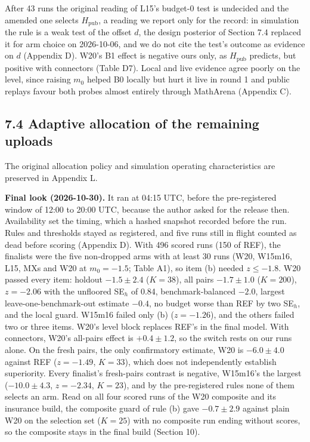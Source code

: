 \documentclass[
]{article}
\begin{document}
After 43 runs the original reading of L15's budget-0 test is undecided
and the amended one selects \(H_{\mathrm{pub}}\), a reading we report
only for the record: in simulation the rule is a weak test of the offset
\(d\), the design posterior of Section 7.4 replaced it for arm choice on
2026-10-06, and we do not cite the test's outcome as evidence on \(d\)
(Appendix D). W20's B1 effect is negative ours only, as
\(H_{\mathrm{pub}}\) predicts, but positive with connectors (Table D7).
Local and live evidence agree poorly on the level, since raising \(m_0\)
helped B0 locally but hurt it live in round 1 and public replays favour
both probes almost entirely through MathArena (Appendix C).

\subsection{7.4 Adaptive allocation of the remaining
uploads}\label{adaptive-allocation-of-the-remaining-uploads}

The original allocation policy and simulation operating characteristics
are preserved in Appendix L.

\textbf{Final look (2026-10-30).} It ran at 04:15 UTC, before the
pre-registered window of 12:00 to 20:00 UTC, because the author asked
for the release then. Availability set the timing, which a hashed
snapshot recorded before the run. Rules and thresholds stayed as
registered, and five runs still in flight counted as dead before scoring
(Appendix D). With 496 scored runs (150 of REF), the finalists were the
five non-dropped arms with at least 30 runs (W20, W15m16, L15, MXs and
W20 at \(m_0 = -1.5\); Table A1), so item (b) needed \(z \le -1.8\). W20
passed every item: holdout \(-1.5 \pm 2.4\) (\(K = 38\)), all pairs
\(-1.7 \pm 1.0\) (\(K = 200\)), \(z = -2.06\) with the unfloored
SE\(_h\) of 0.84, benchmark-balanced \(-2.0\), largest
leave-one-benchmark-out estimate \(-0.4\), no budget worse than REF by
two SE\(_h\), and the local guard. W15m16 failed only (b)
(\(z = -1.26\)), and the others failed two or three items. W20's level
block replaces REF's in the final model. With connectors, W20's
all-pairs effect is \(+0.4 \pm 1.2\), so the switch rests on our runs
alone. On the fresh pairs, the only confirmatory estimate, W20 is
\(-6.0 \pm 4.0\) against REF (\(z = -1.49\), \(K = 33\)), which does not
independently establish superiority. Every finalist's fresh-pairs
contrast is negative, W15m16's the largest (\(-10.0 \pm
4.3\), \(z = -2.34\), \(K = 23\)), and by the pre-registered rules none
of them selects an arm. Read on all four scored runs of the W20
composite and its insurance build, the composite guard of rule (b) gave
\(-0.7 \pm 2.9\) against plain W20 on the selection set (\(K = 25\))
with no composite run ending without scores, so the composite stays in
the final build (Section 10).
\end{document}
